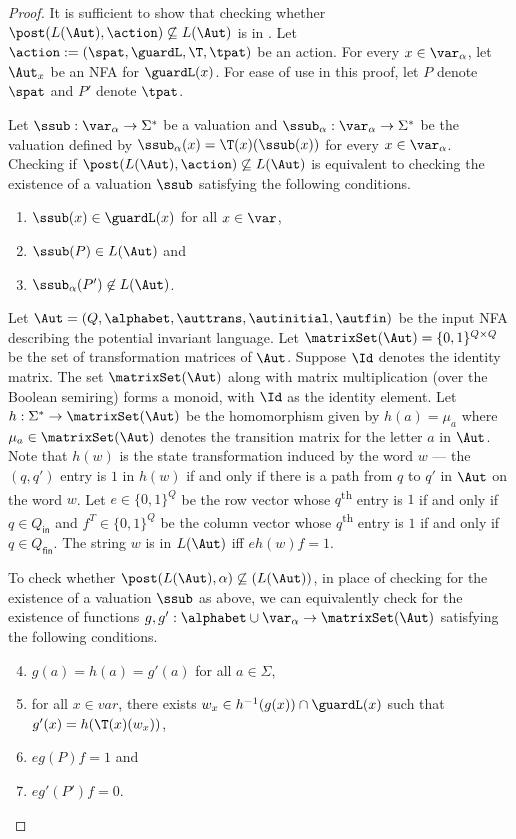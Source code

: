 \begin{proof}
	It is sufficient to show that checking whether $\post(L(\Aut), \action) \not\subseteq L(\Aut)$ is in \psp. Let
	$\action := (\spat, \guardL, \T, \tpat)$ be an action. For every $x \in \var_\alpha$, let  $\Aut_x$ be an NFA for $\guardL(x)$. For ease
	of use in this proof, let $P$ denote $\spat$ and $P'$ denote $\tpat$. 
	
	Let  $\ssub: \var_\alpha \to \Sigma^\ast$ be a valuation and $\ssub_\alpha: \var_\alpha \to \Sigma^\ast$ be the valuation defined by
	$\ssub_\alpha(x) = \T(x)(\ssub(x))$ for every $x \in \var_\alpha$. Checking if $\post(L(\Aut), \action) \not\subseteq L(\Aut)$ is
	equivalent to checking the existence of a valuation $\ssub$ satisfying the following conditions.
  	\begin{enumerate}
  		\item $\ssub(x)\in \guardL(x) $ for all $x \in \var$,
 		\item $\ssub(P) \in L(\Aut)$ and
 		\item $\ssub_\alpha(P') \not\in L(\Aut)$.
 	\end{enumerate}
	
	Let $\Aut = (Q, \alphabet, \auttrans, \autinitial, \autfin)$ be the input NFA describing the potential invariant language. Let
	$\matrixSet(\Aut) = \{0,1\}^{Q \times Q}$ be the set of transformation matrices of $\Aut$. Suppose $\Id $ denotes the identity matrix.
	The set $\matrixSet(\Aut)$ along with matrix multiplication (over the Boolean semiring) forms a monoid, with $\Id$ as the identity
	element. Let $h: \Sigma^\ast \to \matrixSet(\Aut)$ be the homomorphism given by $h(a) = \mu_a$ where  $\mu_a \in \matrixSet(\Aut)$
	denotes the transition matrix for the letter $a$ in $\Aut$.  Note that $h(w)$ is the state transformation induced by the word
	$w$ --- the $(q, q')$ entry is $1$ in $h(w)$ if and only if there is a path from $q$ to $q'$ in $\Aut$ on the word $w$. Let
	$e \in \{0,1\}^Q$ be the  row vector whose $q$\textsuperscript{th} entry is $1$ if and only if $q \in Q_\textsf{in}$ and
	$f^T \in \{0,1\}^Q$ be the column vector whose $q$\textsuperscript{th} entry is $1$ if and only if $q \in Q_\textsf{fin}$. The string
	$w$ is in $L(\Aut)$ iff $eh(w) f =1$.
	
	To check whether $\post(L(\Aut),\alpha) \not\subseteq (L(\Aut))$, in place of checking for the existence of a valuation $\ssub$ as
	above, we can equivalently check for the existence of functions $g,g' : \alphabet \cup \var_\alpha \to \matrixSet(\Aut)$ satisfying
	the following conditions.
	\begin{enumerate}
		\setcounter{enumi}{3}
		\item $g(a) = h(a) = g'(a)$ for all $a \in \Sigma$,
		\item for all $x \in var$, there exists $w_x \in h^{-1}(g(x)) \cap \guardL(x)$ such that $g'(x) = h(\T(x)(w_x))$,
		\item $e g(P) f = 1$ and
		\item $e g'(P') f = 0$.
	\end{enumerate}


\end{proof}
